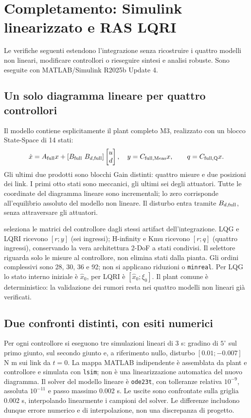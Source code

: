 \section{Completamento: Simulink linearizzato e RAS LQRI}
\label{sec:simulink-completion}
Le verifiche seguenti estendono l'integrazione senza ricostruire i quattro
modelli non lineari, modificare controllori o rieseguire sintesi e analisi robuste.
Sono eseguite con MATLAB/Simulink R2025b Update 4.

\subsection{Un solo diagramma lineare per quattro controllori}
Il modello  contiene esplicitamente
il plant completo M3, realizzato con un blocco State-Space di 14 stati:
\[
 \dot x=A_{\rm full}x+[B_{\rm full}\ B_{d,\rm full}]
 \begin{bmatrix}u\\d\end{bmatrix},\quad
 y=C_{\rm full,Meas}x,\qquad q=C_{\rm full,Q}x.
\]
Gli ultimi due prodotti sono blocchi Gain distinti: quattro misure e due
posizioni dei link. I primi otto stati sono meccanici, gli ultimi sei degli
attuatori. Tutte le coordinate del diagramma lineare sono incrementali;
lo zero corrisponde all'equilibrio assoluto del modello non lineare.
Il disturbo entra tramite $B_{d,\rm full}$, senza attraversare gli attuatori.

 seleziona le matrici del controllore dagli
stessi artifact dell'integrazione. LQG e LQRI ricevono $[r;y]$ (sei ingressi);
H-infinity e Kmu ricevono $[r;q]$ (quattro ingressi), conservando la vera
architettura 2-DoF a stati condivisi. Il selettore riguarda solo le misure
al controllore, non elimina stati dalla pianta. Gli ordini complessivi sono
28, 30, 36 e 92; non si applicano riduzioni o \texttt{minreal}.
Per LQG lo stato interno iniziale è $\hat x_0$, per LQRI è
$[\hat x_0;\xi_0]$. Il plant comune è deterministico: la validazione dei
rumori resta nei quattro modelli non lineari già verificati.

\subsection{Due confronti distinti, con esiti numerici}
Per ogni controllore si eseguono tre simulazioni lineari di 3 s:
gradino di $5^\circ$ sul primo giunto, sul secondo giunto e, a riferimento
nullo, disturbo $[0.01;-0.007]$ N m sui link da $t=0$.
La mappa MATLAB indipendente è assemblata da plant e controllore e simulata
con \texttt{lsim}; non è una linearizzazione automatica del nuovo diagramma.
Il solver del modello lineare è \texttt{ode23t}, con tolleranze relativa
$10^{-9}$, assoluta $10^{-11}$ e passo massimo 0.002 s.
Le uscite sono confrontate sulla griglia 0.002 s, interpolando linearmente
i campioni del solver. Le differenze includono dunque errore numerico e
di interpolazione, non una discrepanza di progetto.

